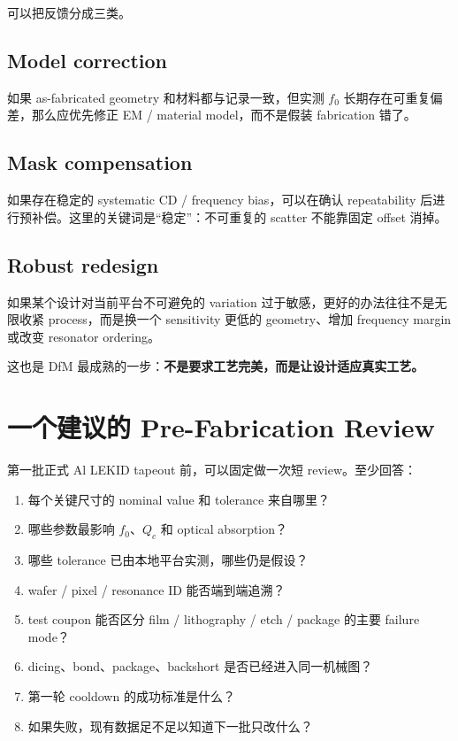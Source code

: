 可以把反馈分成三类。

\subsection{Model correction}

如果 as-fabricated geometry 和材料都与记录一致，但实测 $f_0$ 长期存在可重复偏差，那么应优先修正 EM / material model，而不是假装 fabrication 错了。

\subsection{Mask compensation}

如果存在稳定的 systematic CD / frequency bias，可以在确认 repeatability 后进行预补偿。这里的关键词是“稳定”：不可重复的 scatter 不能靠固定 offset 消掉。

\subsection{Robust redesign}

如果某个设计对当前平台不可避免的 variation 过于敏感，更好的办法往往不是无限收紧 process，而是换一个 sensitivity 更低的 geometry、增加 frequency margin 或改变 resonator ordering。

这也是 DfM 最成熟的一步：\textbf{不是要求工艺完美，而是让设计适应真实工艺。}

\section{一个建议的 Pre-Fabrication Review}

第一批正式 Al LEKID tapeout 前，可以固定做一次短 review。至少回答：

\begin{enumerate}
  \item 每个关键尺寸的 nominal value 和 tolerance 来自哪里？
  \item 哪些参数最影响 $f_0$、$Q_c$ 和 optical absorption？
  \item 哪些 tolerance 已由本地平台实测，哪些仍是假设？
  \item wafer / pixel / resonance ID 能否端到端追溯？
  \item test coupon 能否区分 film / lithography / etch / package 的主要 failure mode？
  \item dicing、bond、package、backshort 是否已经进入同一机械图？
  \item 第一轮 cooldown 的成功标准是什么？
  \item 如果失败，现有数据足不足以知道下一批只改什么？
\end{enumerate}

